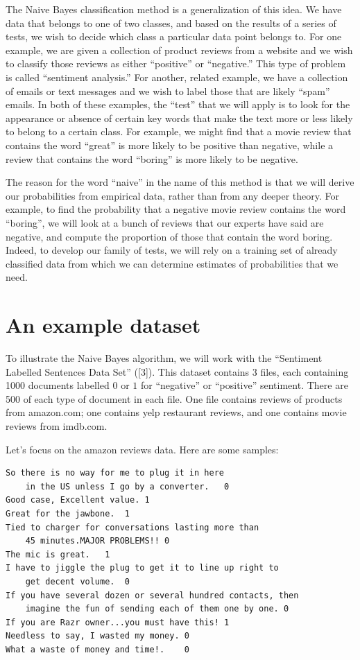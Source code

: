 \documentclass[
  11pt,
  letterpaper,
]{scrbook}
\theoremstyle{plain}
\theoremstyle{plain}
\theoremstyle{remark}
\begin{document}
The Naive Bayes classification method is a generalization of this idea.
We have data that belongs to one of two classes, and based on the
results of a series of tests, we wish to decide which class a particular
data point belongs to. For one example, we are given a collection of
product reviews from a website and we wish to classify those reviews as
either ``positive'' or ``negative.'' This type of problem is called
``sentiment analysis.'' For another, related example, we have a
collection of emails or text messages and we wish to label those that
are likely ``spam'' emails. In both of these examples, the ``test'' that
we will apply is to look for the appearance or absence of certain key
words that make the text more or less likely to belong to a certain
class. For example, we might find that a movie review that contains the
word ``great'' is more likely to be positive than negative, while a
review that contains the word ``boring'' is more likely to be negative.

The reason for the word ``naive'' in the name of this method is that we
will derive our probabilities from empirical data, rather than from any
deeper theory. For example, to find the probability that a negative
movie review contains the word ``boring'', we will look at a bunch of
reviews that our experts have said are negative, and compute the
proportion of those that contain the word boring. Indeed, to develop our
family of tests, we will rely on a training set of already classified
data from which we can determine estimates of probabilities that we
need.

\hypertarget{an-example-dataset}{%
\section{An example dataset}\label{an-example-dataset}}

To illustrate the Naive Bayes algorithm, we will work with the
``Sentiment Labelled Sentences Data Set'' ({[}3{]}). This dataset
contains 3 files, each containing 1000 documents labelled \(0\) or \(1\)
for ``negative'' or ``positive'' sentiment. There are 500 of each type
of document in each file. One file contains reviews of products from
amazon.com; one contains yelp restaurant reviews, and one contains movie
reviews from imdb.com.

Let's focus on the amazon reviews data. Here are some samples:

\begin{verbatim}
So there is no way for me to plug it in here 
    in the US unless I go by a converter.   0
Good case, Excellent value. 1
Great for the jawbone.  1
Tied to charger for conversations lasting more than 
    45 minutes.MAJOR PROBLEMS!! 0
The mic is great.   1
I have to jiggle the plug to get it to line up right to 
    get decent volume.  0
If you have several dozen or several hundred contacts, then 
    imagine the fun of sending each of them one by one. 0
If you are Razr owner...you must have this! 1
Needless to say, I wasted my money. 0
What a waste of money and time!.    0
\end{verbatim}
\end{document}
